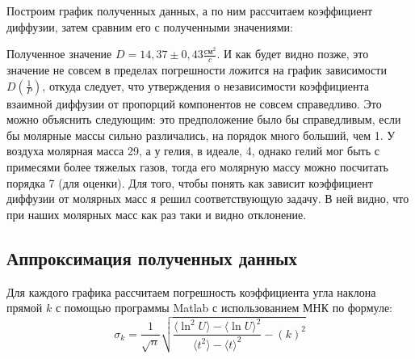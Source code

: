 \documentclass[a4paper,12pt]{article}
\begin{document}
Построим график полученных данных, а по ним рассчитаем коэффициент диффузии, затем сравним его с полученными значениями:

\begin{figure}[!h]
\end{figure}

Полученное значение $D = 14,37 \pm 0,43 \frac{\text{см}^2}{c}.$ И как будет видно позже, это значение не совсем в пределах погрешности ложится на график зависимости $D(\frac{1}{P})$, откуда следует, что утверждения о независимости коэффициента взаимной диффузии от пропорций компонентов не совсем справедливо. Это можно объяснить следующим: это предположение было бы справедливым, если бы молярные массы сильно различались, на порядок много больший, чем 1. У воздуха молярная масса 29, а у гелия, в идеале, 4, однако гелий мог быть с примесями более тяжелых газов, тогда его молярную массу можно посчитать порядка 7 (для оценки). Для того, чтобы понять как зависит коэффициент диффузии от молярных масс я решил соответствующую задачу. В ней видно, что при наших молярных масс как раз таки и видно отклонение.

\subsection{Аппроксимация полученных данных}

Для каждого графика рассчитаем погрешность коэффициента угла наклона прямой $k$ с помощью программы  Matlab с использованием МНК по формуле:
\begin{equation}
	\sigma_k = \dfrac{1}{\sqrt{n}} \sqrt{\dfrac{\langle\ln^2 U\rangle - \langle\ln U\rangle^2}{\langle t^2\rangle - \langle t\rangle^2} - \left(k\right)^2}  
\end{equation}
\end{document}
